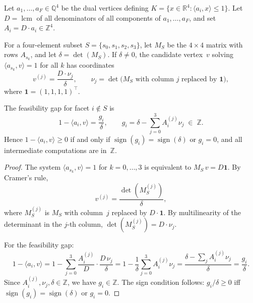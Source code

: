 \begin{unverified}
\begin{proposition}\label{prop:integer-cramer}
Let $a_1, \ldots, a_F \in \mathbb{Q}^4$ be the dual vertices defining
$K = \{x \in \mathbb{R}^4 : \langle a_i, x \rangle \leq 1\}$.
Let $D = \operatorname{lcm}$ of all denominators of all components of
$a_1, \ldots, a_F$, and set $A_i = D \cdot a_i \in \mathbb{Z}^4$.

For a four-element subset $S = \{s_0, s_1, s_2, s_3\}$, let $M_S$ be the
$4 \times 4$ matrix with rows $A_{s_k}$, and let $\delta = \det(M_S)$.
If $\delta \neq 0$, the candidate vertex~$v$ solving
$\langle a_{s_k}, v \rangle = 1$ for all $k$ has coordinates
\[
  v^{(j)} = \frac{D \cdot \nu_j}{\delta},
  \qquad
  \nu_j = \det\!\bigl(M_S \text{ with column } j
    \text{ replaced by } \mathbf{1}\bigr),
\]
where $\mathbf{1} = (1,1,1,1)^\top$.

The feasibility gap for facet $i \notin S$ is
\[
  1 - \langle a_i, v \rangle
  = \frac{g_i}{\delta},
  \qquad
  g_i = \delta - \sum_{j=0}^{3} A_i^{(j)} \nu_j \;\in\; \mathbb{Z}.
\]
Hence $1 - \langle a_i, v \rangle \geq 0$ if and only if
$\operatorname{sign}(g_i) = \operatorname{sign}(\delta)$ or $g_i = 0$,
and all intermediate computations are in~$\mathbb{Z}$.
\end{proposition}

\begin{proof}
The system $\langle a_{s_k}, v \rangle = 1$ for $k = 0, \ldots, 3$
is equivalent to $M_S\,v = D\mathbf{1}$.
By Cramer's rule,
\[
  v^{(j)} = \frac{\det(M_S^{(j)})}{\delta},
\]
where $M_S^{(j)}$ is $M_S$ with column~$j$ replaced by
$D \cdot \mathbf{1}$.
By multilinearity of the determinant in the $j$-th column,
$\det(M_S^{(j)}) = D \cdot \nu_j$.

For the feasibility gap:
\[
  1 - \langle a_i, v \rangle
  = 1 - \sum_{j=0}^{3} \frac{A_i^{(j)}}{D} \cdot \frac{D\, \nu_j}{\delta}
  = 1 - \frac{1}{\delta} \sum_{j=0}^{3} A_i^{(j)} \nu_j
  = \frac{\delta - \sum_j A_i^{(j)} \nu_j}{\delta}
  = \frac{g_i}{\delta}.
\]
Since $A_i^{(j)}, \nu_j, \delta \in \mathbb{Z}$, we have $g_i \in \mathbb{Z}$.
The sign condition follows: $g_i / \delta \geq 0$ iff
$\operatorname{sign}(g_i) = \operatorname{sign}(\delta)$ or $g_i = 0$.
\end{proof}
\end{unverified}

